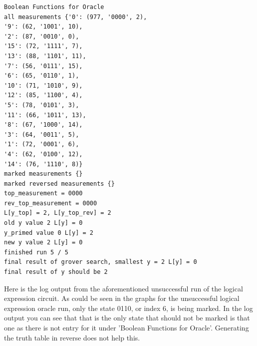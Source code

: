 \documentclass[11pt]{article}
\begin{document}
\begin{verbatim}
Boolean Functions for Oracle
all measurements {'0': (977, '0000', 2),
'9': (62, '1001', 10),
'2': (87, '0010', 0),
'15': (72, '1111', 7),
'13': (88, '1101', 11),
'7': (56, '0111', 15),
'6': (65, '0110', 1),
'10': (71, '1010', 9),
'12': (85, '1100', 4),
'5': (78, '0101', 3),
'11': (66, '1011', 13),
'8': (67, '1000', 14),
'3': (64, '0011', 5),
'1': (72, '0001', 6),
'4': (62, '0100', 12),
'14': (76, '1110', 8)}
marked measurements {}
marked reversed measurements {}
top_measurement = 0000
rev_top_measurement = 0000
L[y_top] = 2, L[y_top_rev] = 2
old y value 2 L[y] = 0
y_primed value 0 L[y] = 2
new y value 2 L[y] = 0
finished run 5 / 5
final result of grover search, smallest y = 2 L[y] = 0
final result of y should be 2
\end{verbatim}

\newpage
Here is the log output from the aforementioned unsuccessful run of the logical expression circuit. As could be seen in the graphs for the unsuccessful logical expression oracle run, only the state 0110, or index 6, is being marked. In the log output you can see that that is the only state that should not be marked is that one as there is not entry for it under 'Boolean Functions for Oracle'. Generating the truth table in reverse does not help this.
\end{document}
